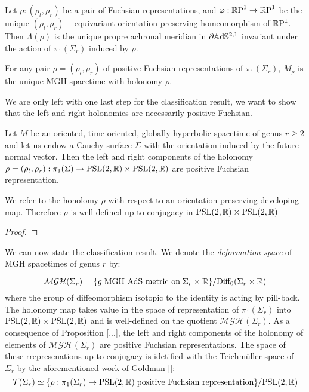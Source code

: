 \begin{lemma}
    Let $\rho:(\rho_l,\rho_r)$ be a pair of Fuchsian representations, and $\varphi:\mathbb{R}\text{P}^1\to\mathbb{R}\text{P}^1$ be the unique $(\rho_l,\rho_r)-$equivariant orientation-preserving homeomorphism of $\mathbb{R}\text{P}^1.$ Then $\Lambda(\rho)$ is the unique propre achronal meridian in $\partial\mathbb{A}\mathrm{d}\mathbb{S}^{2,1}$ invariant under the action of $\pi_1(\Sigma_r)$ induced by $\rho.$
\end{lemma}

\begin{corollary}
    For any pair $\rho=(\rho_l,\rho_r)$ of positive Fuchsian representations of $\pi_1(\Sigma_r)$, $M_\rho$ is the unique MGH spacetime with holonomy $\rho$.
\end{corollary}

We are only left with one last step for the classification result, we want to show that the left and right holonomies are necessarily positive Fuchsian. 

\begin{proposition}
    Let $M$ be an oriented, time-oriented, globally hyperbolic spacetime of genus $r\geq 2$ and let us endow a Cauchy surface $\Sigma$ with the orientation induced by the future normal vector. Then the left and right components of the holonomy $\rho=(\rho_l,\rho_r):\pi_1(\Sigma)\to\text{PSL}(2,\mathbb{R})\times\text{PSL}(2,\mathbb{R})$ are positive Fuchsian representation. 
\end{proposition}

\begin{observation}
We refer to the honolomy $\rho$ with respect to an orientation-preserving developing map. Therefore $\rho$ is well-defined up to conjugacy in $\text{PSL}(2,\mathbb{R})\times\text{PSL}(2,\mathbb{R})$
\end{observation}
\begin{proof}
    
\end{proof}

We can now state the classification result. We denote the \textit{deformation space} of MGH spacetimes of genus $r$ by:

\[
    \mathcal{MGH}(\Sigma_r)=\{g\;\text{MGH AdS metric on}\;\Sigma_r\times\mathbb{R}\}/\text{Diff}_0(\Sigma_r\times\mathbb{R})
\]
where the group of diffeomorphism isotopic to the identity is acting by pill-back. The holonomy map takes value in the space of representation of $\pi_1(\Sigma_r)$ into $\text{PSL}(2,\mathbb{R})\times\text{PSL}(2,\mathbb{R})$ and is well-defined on the quotient $ \mathcal{MGH}(\Sigma_r).$
As a consequence of Proposition [...], the left and right components of the holonomy of elements of $ \mathcal{MGH}(\Sigma_r)$ are positive Fuchsian representations. The space of these rrepresenations up to conjugacy is idetified with the Teichm\"uller space of $\Sigma_r$ by the aforementioned work of Goldman []:
\[
    \mathcal{T}(\Sigma_r)\simeq\{\rho:\pi_1(\Sigma_r)\to\text{PSL}(2,\mathbb{R})\;\text{positive Fuchsian representation}\}/\text{PSL}(2,\mathbb{R})
\]

